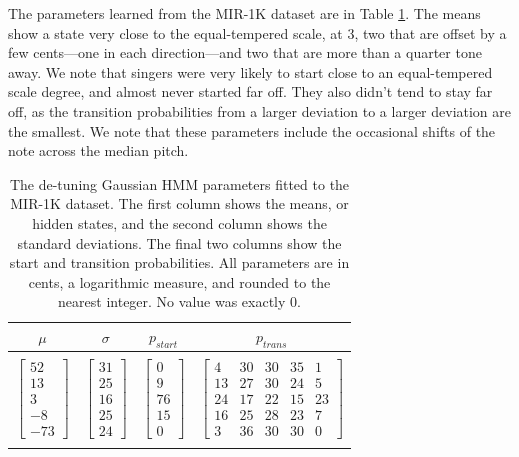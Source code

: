 The parameters learned from the MIR-1K dataset are in Table \ref{tab:detuning-hmm}. The means show a state very close to the equal-tempered scale, at 3, two that are offset by a few cents---one in each direction---and two that are more than a quarter tone away. We note that singers were very likely to start close to an equal-tempered scale degree, and almost never started far off. They also didn't tend to stay far off, as the transition probabilities from a larger deviation to a larger deviation are the smallest. We note that these parameters include the occasional shifts of the note across the median pitch.

\begin{table}[t]
  \begin{center}
    \begin{tabular}{|c|c|c|c|}
    \hline
      $\mu$ & $\sigma$ & $p_{start}$ & $p_{trans}$ \\
      \hline
      &&& \\
      $\left[ \begin{array}{c} 52 \\  13 \\3\\-8\\-73 \end{array}\right]$
      & $\left[ \begin{array}{c} 31  \\ 25\\16\\25\\24 \end{array}\right]$
      & $\left[ \begin{array}{c} 0  \\ 9\\76\\15\\0 \end{array}\right]$
      & $\left[ \begin{array}{ccccc} 4 & 30 & 30 & 35 & 1  \\ 13&27&30&24&5\\24&17&22&15&23\\16&25&28&23&7\\3&36&30&30&0 \end{array}\right]$  \\
      &&& \\
      \hline
    \end{tabular}
    \label{tab:detuning-hmm}
    \caption{The de-tuning Gaussian HMM parameters fitted to the MIR-1K dataset. The first column shows the means, or hidden states, and the second column shows the standard deviations. The final two columns show the start and transition probabilities. All parameters are in cents, a logarithmic measure, and rounded to the nearest integer. No value was exactly 0.}
  \end{center}
\end{table}

